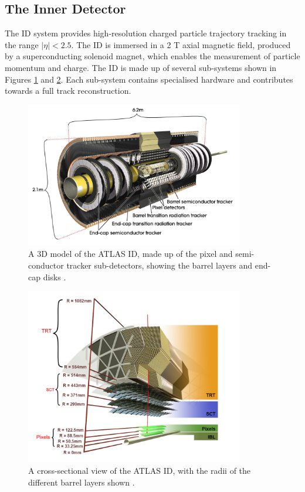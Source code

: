 \subsection{The Inner Detector}
\label{inner-detector}

The ID system provides high-resolution charged particle trajectory tracking in the range $ \lvert \eta \rvert < 2.5$. The ID is immersed in a 2 T axial magnetic field, produced by a superconducting solenoid magnet, which enables the measurement of particle momentum and charge. The ID is made up of several sub-systems shown in Figures \ref{fig:atlas-id-run1} and \ref{fig:atlas-id-run2}. Each sub-system contains specialised hardware and contributes towards a full track reconstruction. 

\begin{figure}[!htbp]
  \centering
  \includegraphics[width=0.85\textwidth]{images/2-LHC-ATLAS/atlas_id.jpg}
  \caption{
    A 3D model of the ATLAS ID, made up of the pixel and semi-conductor tracker sub-detectors, showing the barrel layers and end-cap disks \cite{atlasid}.
  }
  \label{fig:atlas-id-run1}
\end{figure}

\begin{figure}[!htbp]
  \centering
  \includegraphics[width=0.85\textwidth]{images/2-LHC-ATLAS/atlas_id_xs.png}
  \caption{
    A cross-sectional view of the ATLAS ID, with the radii of the different barrel layers shown \cite{atlastrackingdocs}.
  }
  \label{fig:atlas-id-run2}
\end{figure}

